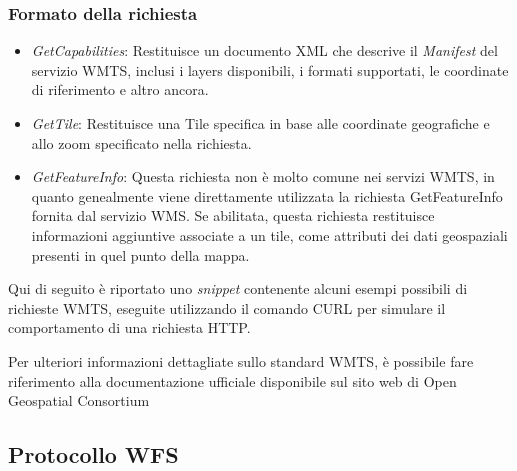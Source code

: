 \subsubsection{Formato della richiesta}

\begin{itemize}
      \item \textit{GetCapabilities}: Restituisce un documento XML che descrive il \textit{Manifest} del servizio WMTS, inclusi i layers disponibili, i formati supportati, le coordinate di riferimento e altro ancora.
      \item \textit{GetTile}: Restituisce una Tile specifica in base alle coordinate geografiche e allo zoom specificato nella richiesta.
      \item \textit{GetFeatureInfo}: Questa richiesta non è molto comune nei servizi WMTS, in quanto genealmente viene direttamente utilizzata la richiesta GetFeatureInfo fornita dal servizio WMS. Se abilitata, questa richiesta restituisce informazioni aggiuntive associate a un tile, come attributi dei dati geospaziali presenti in quel punto della mappa.
\end{itemize}
Qui di seguito è riportato uno \textit{snippet} contenente alcuni esempi possibili di richieste WMTS, eseguite utilizzando il comando CURL per simulare il comportamento di una richiesta HTTP.


Per ulteriori informazioni dettagliate sullo standard WMTS, è possibile fare riferimento alla documentazione ufficiale disponibile sul sito web di Open Geospatial Consortium \cite{DocumentazioneWMTS}

\subsection{Protocollo WFS}


